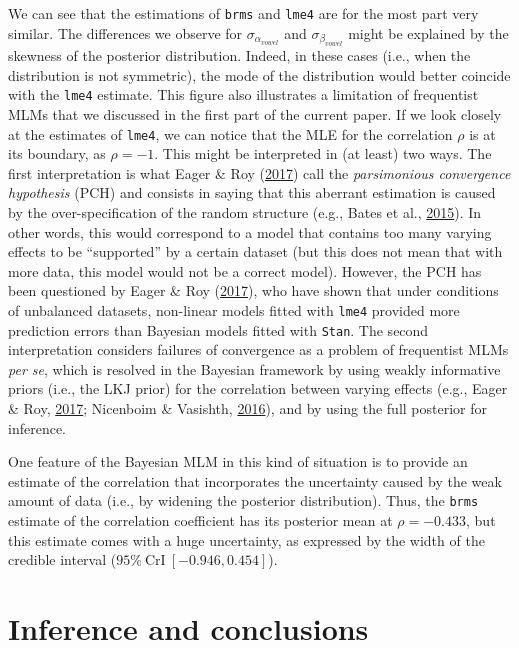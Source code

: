 \documentclass[a4paper,12pt,twoside,onecolumn,openright,final,oldfontcommands]{memoir}
\begin{document}
We can see that the estimations of \texttt{brms} and \texttt{lme4} are for the most part very similar. The differences we observe for \(\sigma_{\alpha_{vowel}}\) and \(\sigma_{\beta_{vowel}}\) might be explained by the skewness of the posterior distribution. Indeed, in these cases (i.e., when the distribution is not symmetric), the mode of the distribution would better coincide with the \texttt{lme4} estimate. This figure also illustrates a limitation of frequentist MLMs that we discussed in the first part of the current paper. If we look closely at the estimates of \texttt{lme4}, we can notice that the MLE for the correlation \(\rho\) is at its boundary, as \(\rho = -1\). This might be interpreted in (at least) two ways. The first interpretation is what Eager \& Roy (\protect\hyperlink{ref-eager_mixed_2017}{2017}) call the \emph{parsimonious convergence hypothesis} (PCH) and consists in saying that this aberrant estimation is caused by the over-specification of the random structure (e.g., Bates et al., \protect\hyperlink{ref-bates_parsimonious_2015}{2015}). In other words, this would correspond to a model that contains too many varying effects to be \enquote{supported} by a certain dataset (but this does not mean that with more data, this model would not be a correct model). However, the PCH has been questioned by Eager \& Roy (\protect\hyperlink{ref-eager_mixed_2017}{2017}), who have shown that under conditions of unbalanced datasets, non-linear models fitted with \texttt{lme4} provided more prediction errors than Bayesian models fitted with \texttt{Stan}. The second interpretation considers failures of convergence as a problem of frequentist MLMs \emph{per se}, which is resolved in the Bayesian framework by using weakly informative priors (i.e., the LKJ prior) for the correlation between varying effects (e.g., Eager \& Roy, \protect\hyperlink{ref-eager_mixed_2017}{2017}; Nicenboim \& Vasishth, \protect\hyperlink{ref-nicenboim_statistical_2016}{2016}), and by using the full posterior for inference.

One feature of the Bayesian MLM in this kind of situation is to provide an estimate of the correlation that incorporates the uncertainty caused by the weak amount of data (i.e., by widening the posterior distribution). Thus, the \texttt{brms} estimate of the correlation coefficient has its posterior mean at \(\rho = -0.433\), but this estimate comes with a huge uncertainty, as expressed by the width of the credible interval (\(95\% \ \text{CrI}\ [-0.946,0.454]\)).

\hypertarget{inference-and-conclusions}{%
\section{Inference and conclusions}\label{inference-and-conclusions}}
\end{document}

